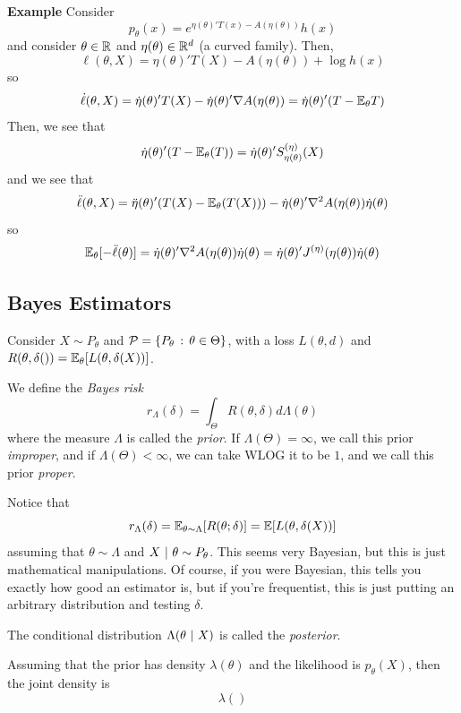 \begin{example}{\textbf{Example}}
    Consider
    \[ p_{\theta}(x) = e^{\eta(\theta)'T(x) - A(\eta(\theta))}h(x) \]
    and consider $\theta \in \mathbb{R}$ and $\eta(\theta) \in \mathbb{R}^{d}$ (a curved family). Then, 
    \[ \ell(\theta, X) = \eta(\theta)'T(X) - A(\eta(\theta)) + \log h(x) \]
    so
    \[ \dot{\ell}(\theta, X) = \dot{\eta}(\theta)'T(X) - \dot{\eta}(\theta)'\nabla A(\eta(\theta)) = \dot{\eta}(\theta)'(T - \mathbb{E}_{\theta} T) \]
    Then, we see that
    \[ \dot{\eta}(\theta)'(T - \mathbb{E}_{\theta}(T)) = \dot{\eta}(\theta)'S_{\eta(\theta)}^{(\eta)}(X) \]
    and we see that
    \[ \ddot{\ell}(\theta, X) = \ddot{\eta}(\theta)'(T(X) - \mathbb{E}_{\theta}(T(X))) - \dot{\eta}(\theta)'\nabla^2 A(\eta(\theta)) \dot{\eta}(\theta) \]
    so 
    \[ \mathbb{E}_{\theta}[-\ddot{\ell}(\theta)] = \dot{\eta}(\theta)'\nabla^2 A(\eta(\theta))\dot{\eta}(\theta) = \dot{\eta}(\theta)'J^{(\eta)}(\eta(\theta))\dot{\eta}(\theta) \]
\end{example}

\subsection*{Bayes Estimators}
\sectionspace

Consider $X \sim P_{\theta}$ and $\mathcal{P} = \{P_{\theta} \, :\, \theta \in \Theta\}$, with a loss $L(\theta, d)$ and $R(\theta, \delta()) = \mathbb{E}_{\theta}[L(\theta, \delta(X))]$. 

\begin{definition}
    We define the \emph{Bayes risk}
    \[ r_{\Lambda}(\delta) = \int_{\Theta} R(\theta, \delta) d\Lambda(\theta) \]
    where the measure $\Lambda$ is called the \emph{prior}. If $\Lambda(\Theta) = \infty$, we call this prior \emph{improper}, and if $\Lambda(\Theta) < \infty$, we can take WLOG it to be $1$, and we call this prior \emph{proper}.
\end{definition}
Notice that
\[ r_{\Lambda}(\delta) = \mathbb{E}_{\theta \sim \Lambda}[R(\theta; \delta)] = \mathbb{E}[L(\theta, \delta(X))] \]
assuming that $\theta \sim \Lambda$ and $X \ |\  \theta \sim P_{\theta}$. This seems very Bayesian, but this is just mathematical manipulations. Of course, if you were Bayesian, this tells you exactly how good an estimator is, but if you're frequentist, this is just putting an arbitrary distribution and testing $\delta$.\\

\begin{definition}
    The conditional distribution $\Lambda(\theta \ |\  X)$ is called the \emph{posterior}.
\end{definition}

Assuming that the prior has density $\lambda(\theta)$ and the likelihood is $p_{\theta}(X)$, then the joint density is
\[ \lambda() \]




